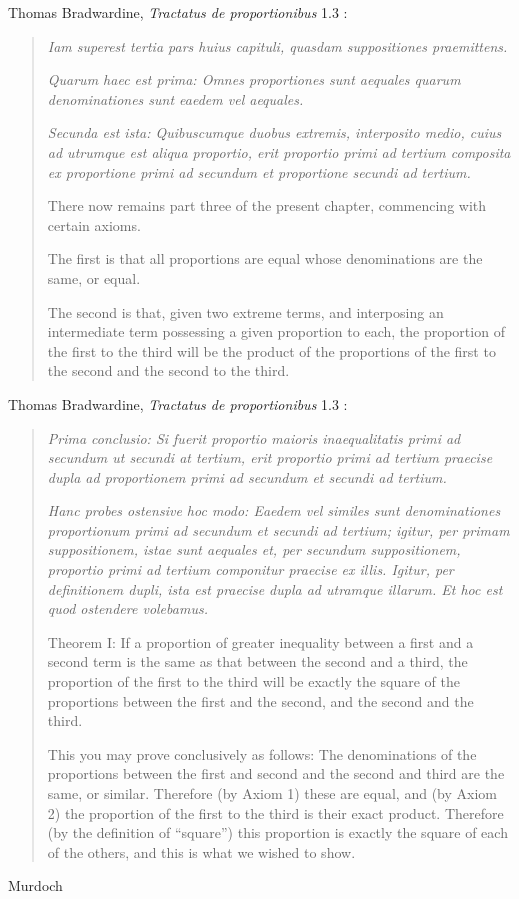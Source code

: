 \documentclass{article}
\begin{document}
Thomas Bradwardine, {\em Tractatus de proportionibus} 1.3 \cite[pp.~76--77]{bradwardine}:

\begin{quote}
{\em Iam superest tertia pars huius capituli, quasdam suppositiones
praemittens.}

{\em Quarum haec est prima: Omnes proportiones sunt aequales
quarum denominationes sunt eaedem vel aequales.}

{\em Secunda est ista: Quibuscumque duobus extremis, interposito
medio, cuius ad utrumque est aliqua proportio, erit proportio
primi ad tertium composita ex proportione primi ad secundum et
proportione secundi ad tertium.}

There now remains part three of the present chapter, commencing
with certain axioms.

The first is that all proportions are equal whose denominations are
the same, or equal.

The second is that, given two extreme terms, and interposing an
intermediate term possessing a given proportion to each, the proportion
of the first to the third will be the product of the proportions of
the first to the second and the second to the third.
\end{quote} 

Thomas Bradwardine, {\em Tractatus de proportionibus} 1.3 \cite[pp.~78--79]{bradwardine}:

\begin{quote}
{\em Prima conclusio: Si fuerit proportio maioris inaequalitatis
primi ad secundum ut secundi at tertium, erit proportio primi
ad tertium praecise dupla ad proportionem primi ad secundum
et secundi ad tertium.}

{\em Hanc probes ostensive hoc modo: Eaedem vel similes sunt denominationes
proportionum primi ad secundum et secundi ad tertium;
igitur, per primam suppositionem, istae sunt aequales et, per
secundum suppositionem, proportio primi ad tertium componitur
praecise ex illis. Igitur, per definitionem dupli, ista est praecise
dupla ad utramque illarum. Et hoc est quod ostendere volebamus.}

Theorem I: If a proportion of greater inequality between a first
and a second term is the same as that between the second and a third,
the proportion of the first to the third will be exactly the square of
the proportions between the first and the second, and the second and
the third.

This you may prove conclusively as follows: The denominations
of the proportions between the first and second and the second and
third are the same, or similar. Therefore (by Axiom 1) these are
equal, and (by Axiom 2) the proportion of the first to the third is
their exact product. Therefore (by the definition of ``square'') this
proportion is exactly the square of each of the others, and this is
what we wished to show.
\end{quote}









Murdoch \cite{murdoch}





\end{document}
